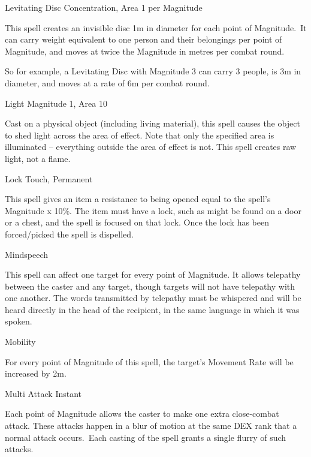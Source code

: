 \begin{rpg-spell}
{Levitating Disc}
{Concentration, Area 1 per Magnitude}

This spell creates an invisible disc 1m in diameter for each point of Magnitude. It can carry weight equivalent to one person and their belongings per point of Magnitude, and moves at twice the Magnitude in metres per combat round.

So for example, a Levitating Disc with Magnitude 3 can carry 3 people, is 3m in diameter, and moves at a rate of 6m per combat round.
\end{rpg-spell}


\begin{rpg-spell}
{Light}
{Magnitude 1, Area 10}

Cast on a physical object (including living material), this spell causes the object to shed light across the area of effect. Note that only the specified area is illuminated – everything outside the area of effect is not. This spell creates raw light, not a flame.
\end{rpg-spell}


\begin{rpg-spell}
{Lock}
{Touch, Permanent}

This spell gives an item a resistance to being opened equal to the spell’s Magnitude x 10\%. The item must have a lock, such as might be found on a door or a chest, and the spell is focused on that lock. Once the lock has been forced/picked the spell is dispelled.
\end{rpg-spell}


\begin{rpg-spell}
{Mindspeech}
{}

This spell can affect one target for every point of Magnitude. It allows telepathy between the caster and any target, though targets will not have telepathy with one another. The words transmitted by telepathy must be whispered and will be heard directly in the head of the recipient, in the same language in which it was spoken. 
\end{rpg-spell}


\begin{rpg-spell}
{Mobility}
{}

For every point of Magnitude of this spell, the target’s Movement Rate will be increased by 2m.
\end{rpg-spell}


\begin{rpg-spell}
{Multi Attack}
{Instant}

Each point of Magnitude allows the caster to make one extra close-combat attack. These attacks happen in a blur of motion at the same DEX rank that a normal attack occurs. Each casting of the spell grants a single flurry of such attacks.
\end{rpg-spell}


